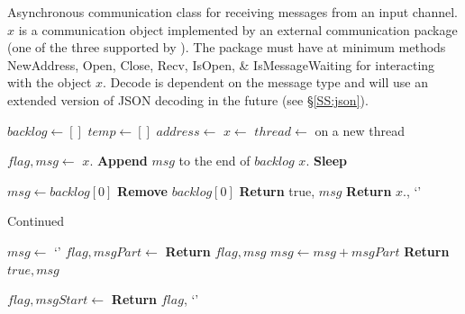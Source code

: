 \documentclass[journal]{IEEEtran}
\newcommand{\todo}[1]{{\color{red}{#1}}}
\newcommand{\pkg}{{\tt \todo{cis\_interface}}{}}
\begin{document}
\begin{appendices}
\begin{algorithm}[H]
    \caption{Asynchronous communication class for receiving messages from an input channel. $x$ is a communication object implemented by an external communication package (one of the three supported by {\pkg}). The package must have at minimum methods {\sc NewAddress, Open, Close, Recv, IsOpen, \& IsMessageWaiting} for interacting with the object $x$. {\sc Decode} is dependent on the message type and will use an extended version of JSON decoding in the future (see \S\ref{SS:json}).}
    \label{alg:async_recv}
    \begin{algorithmic}[1]
    \item[]
    	\State $backlog \gets []$
	\State $temp \gets []$
		\State $address \gets$ 
	\EndIf
	\State $x \gets$ 
	\State $thread \gets$  on a new thread
	\item[]
				\State $flag, msg \gets$ $x$.
					\State \textbf{Append} $msg$ to the end of $backlog$
				\Else
					\State $x$.
				\EndIf
			\Else
				\State \textbf{Sleep}
			\EndIf
		\EndWhile
	\EndClassMethod
	\item[]
			\State $msg \gets backlog[0]$
			\State \textbf{Remove} $backlog[0]$
			\State \textbf{Return} true, $msg$
		\Else
			\State \textbf{Return} $x.$, `'
		\EndIf
	\EndClassMethod
	\item[]
	\end{algorithmic}
\end{algorithm}
\addtocounter{algorithm}{-1}
\begin{algorithm}[H]
	\caption{Continued}
	\begin{algorithmic}[1]
		\State $msg \gets$ `'
			\State $flag, msgPart \gets$ 
				\State \textbf{Return} $flag, msg$
			\EndIf
			\State $msg \gets msg + msgPart$
		\EndWhile
		\State \textbf{Return} $true, msg$
	\EndClassMethod
	\item[]
		\State $flag, msgStart \gets $
			\State \textbf{Return} $flag$, `'

\end{algorithmic}
\end{algorithm}
\end{appendices}
\end{document}
